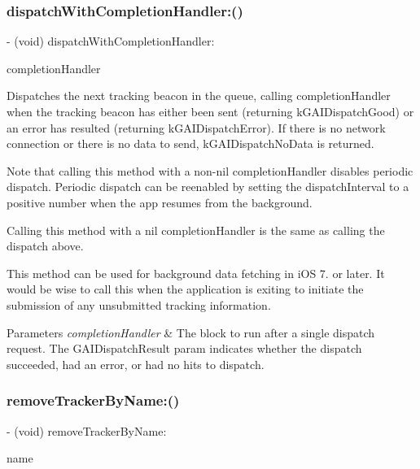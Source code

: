 \subsubsection{\texorpdfstring{dispatch\+With\+Completion\+Handler\+:()}{dispatchWithCompletionHandler:()}}
{\footnotesize\ttfamily -\/ (void) dispatch\+With\+Completion\+Handler\+: \begin{DoxyParamCaption}\item[{(void($^\wedge$)(G\+A\+I\+Dispatch\+Result result))}]{completion\+Handler }\end{DoxyParamCaption}}

Dispatches the next tracking beacon in the queue, calling completion\+Handler when the tracking beacon has either been sent (returning k\+G\+A\+I\+Dispatch\+Good) or an error has resulted (returning k\+G\+A\+I\+Dispatch\+Error). If there is no network connection or there is no data to send, k\+G\+A\+I\+Dispatch\+No\+Data is returned.

Note that calling this method with a non-\/nil completion\+Handler disables periodic dispatch. Periodic dispatch can be reenabled by setting the dispatch\+Interval to a positive number when the app resumes from the background.

Calling this method with a nil completion\+Handler is the same as calling the dispatch above.

This method can be used for background data fetching in i\+OS 7. or later. It would be wise to call this when the application is exiting to initiate the submission of any unsubmitted tracking information.


\begin{DoxyParams}{Parameters}
{\em completion\+Handler} & The block to run after a single dispatch request. The G\+A\+I\+Dispatch\+Result param indicates whether the dispatch succeeded, had an error, or had no hits to dispatch. \\
\hline
\end{DoxyParams}
\mbox{\label{interface_g_a_i_a6fa05df65911abbdeb4bb7d70389cf99}} 
\subsubsection{\texorpdfstring{remove\+Tracker\+By\+Name\+:()}{removeTrackerByName:()}}
{\footnotesize\ttfamily -\/ (void) remove\+Tracker\+By\+Name\+: \begin{DoxyParamCaption}\item[{(N\+S\+String $\ast$)}]{name }\end{DoxyParamCaption}}

